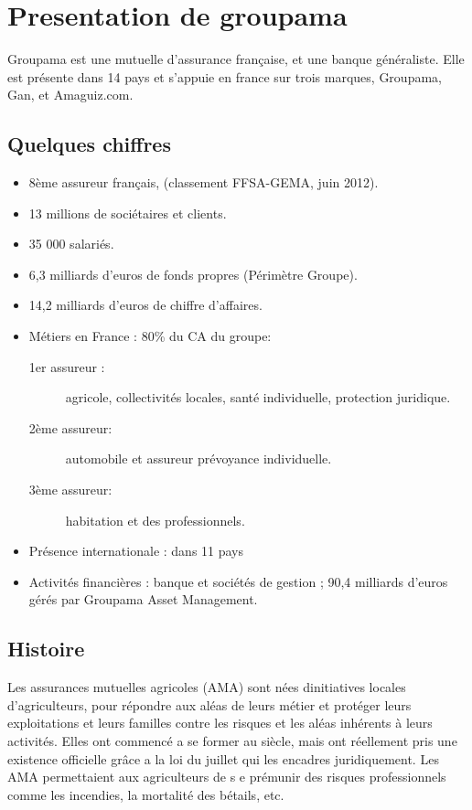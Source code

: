 \chapter{Presentation de groupama}

Groupama est une mutuelle d'assurance française, et une banque généraliste. Elle est présente dans 14 pays et s'appuie en france sur trois marques, Groupama, Gan, et Amaguiz.com.

\section{Quelques chiffres}

\begin{itemize}
\item 8ème assureur français, (classement FFSA-GEMA, juin 2012).
\item 13 millions de sociétaires et clients.
\item 35 000 salariés.
\item 6,3 milliards d’euros de fonds propres (Périmètre Groupe).
\item 14,2 milliards d’euros de chiffre d’affaires.
\item Métiers en France : 80\% du CA du groupe:
  \begin{description}
  \item [1er assureur :] agricole, collectivités locales, santé individuelle, protection juridique.
  \item [2ème assureur:] automobile et assureur prévoyance individuelle.
  \item [3ème assureur:] habitation et des professionnels.
  \end{description}
\item Présence internationale : dans 11 pays
\item Activités financières : banque et sociétés de gestion ; 90,4 milliards d’euros gérés par Groupama Asset Management.
\end{itemize}

\section{Histoire}

Les assurances mutuelles agricoles (AMA) sont nées dinitiatives locales d'agriculteurs, pour répondre aux aléas de leurs métier et protéger leurs exploitations et leurs familles contre les risques et les aléas inhérents à leurs activités. Elles ont commencé a se former au  siècle, mais ont réellement pris une existence officielle grâce a la loi du juillet qui les encadres juridiquement. Les AMA permettaient aux agriculteurs de s e prémunir des risques professionnels comme les incendies, la mortalité des bétails, etc.

